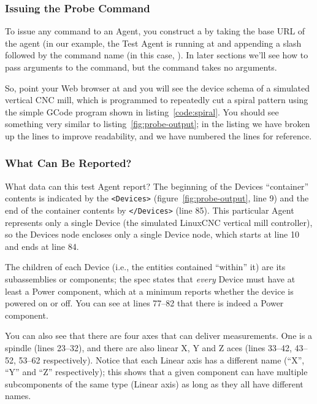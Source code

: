 \subsubsection{Issuing the Probe Command}

To issue any \mtc{} command to an Agent, you construct a  by
taking the base URL of the agent (in our example, the Test Agent is
running at
\icode{\agenturl} and appending a slash followed by the command name (in
this case, ).  In later sections we'll see how to pass
arguments to the command, but the  command takes no arguments.

So, point your Web browser at  and you will see
the device schema of a simulated vertical CNC mill, which is programmed
to repeatedly cut a spiral pattern using the simple GCode program shown in
listing~\ref{code:spiral}.  You should see something very similar to
listing~\ref{fig:probe-output}; in the listing we have broken up the
lines to improve readability, and we have numbered the lines for
reference. 

\subsubsection{What Can Be Reported?}
\label{sec:interpreting-device-schema}

What data can this test Agent report?
The beginning of the Devices
``container'' contents is indicated by the 
\verb+<Devices>+ (figure~\ref{fig:probe-output}, line 9) and the end of
the container contents by \verb+</Devices>+ (line 85).  This particular
Agent represents only a single Device (the simulated LinuxCNC vertical
mill controller), so the Devices node encloses only a single Device
node, which starts at line 10 and ends at line 84.

The children of each
Device (i.e., the entities contained ``within'' it) 
are its subassemblies or components; the \mtc spec states that
\emph{every} Device
must have at least a Power component, which at a minimum reports whether
the device is powered on or off.   You can see at lines 77--82 that
there is indeed a Power component.

You can also see that there are four axes that can deliver
measurements.  One is a spindle (lines 23--32), and there are also
linear X, Y and Z aces (lines 33--42, 43--52, 53--62 respectively).
Notice that each Linear axis has a different name (``X'', ``Y'' and
``Z'' respectively); this shows that a given component can have multiple
subcomponents of the same type (Linear axis) as long as they all have
different names.

